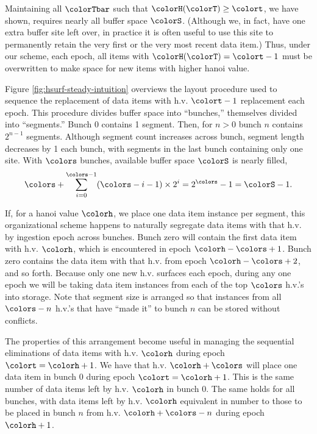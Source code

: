 

Maintaining all $\colorTbar$ such that $\colorH(\colorT) \geq \colort$, we have shown, requires nearly all buffer space $\colorS$.
(Although we, in fact, have one extra buffer site left over, in practice it is often useful to use this site to permanently retain the very first or the very most recent data item.)
Thus, under our scheme, each epoch, all items with $\colorH(\colorT) = \colort - 1$ must be overwritten to make space for new items with higher hanoi value.

Figure \ref{fig:hsurf-steady-intuition} overviews the layout procedure used to sequence the replacement of data items with h.v. $\colort - 1$ replacement each epoch.
This procedure divides buffer space into ``bunches,'' themselves divided into ``segments.''
Bunch 0 contains 1 segment.
Then, for $n > 0$ bunch $n$ contains $2^{n-1}$ segments.
Although segment count increases across bunch, segment length decreases by 1 each bunch, with segments in the last bunch containing only one site.
With $\colors$ bunches, available buffer space $\colorS$ is nearly filled,
\begin{align*}
\colors + \sum_{i=0}^{\colors-1} (\colors - i - 1) \times 2^{i} = 2^{\colors} - 1 = \colorS - 1.
\end{align*}

If, for a hanoi value $\colorh$, we place one data item instance per segment, this organizational scheme happens to naturally segregate data items with that h.v. by ingestion epoch across bunches.
Bunch zero will contain the first data item with h.v. $\colorh$, which is encountered in epoch $\colorh - \colors + 1$.
Bunch zero contains the data item with that h.v. from epoch $\colorh - \colors + 2$, and so forth.
Because only one new h.v. surfaces each epoch, during any one epoch we will be taking data item instances from each of the top $\colors$ h.v.'s into storage.
Note that segment size is arranged so that instances from all $\colors - n$ h.v.'s that have ``made it'' to bunch $n$ can be stored without conflicts.



The properties of this arrangement become useful in managing the sequential eliminations of data items with h.v. $\colorh$ during epoch $\colort=\colorh + 1$.
We have that h.v. $\colorh + \colors$ will place one data item in bunch 0 during epoch $\colort=\colorh + 1$.
This is the same number of data items left by h.v. $\colorh$ in bunch 0.
The same holds for all bunches, with data items left by h.v. $\colorh$ equivalent in number to those to be placed in bunch $n$ from h.v. $\colorh + \colors - n$ during epoch $\colorh + 1$.

